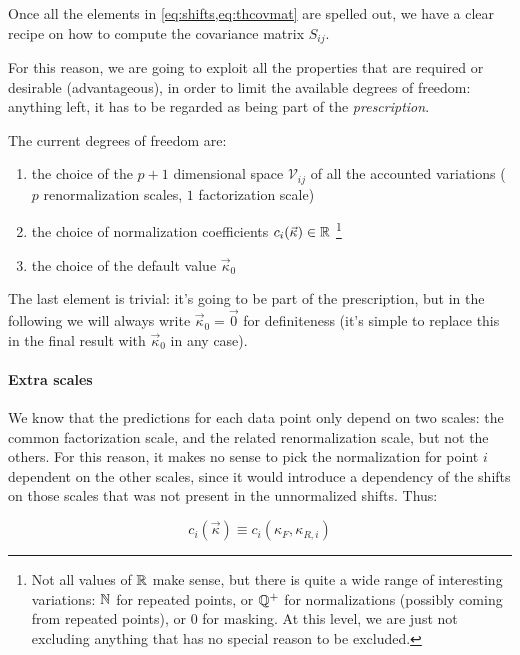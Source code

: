 Once all the elements in \cref{eq:shifts,eq:thcovmat} are spelled out, we have a clear
recipe on how to compute the covariance matrix $S_{ij}$.

For this reason, we are going to exploit all the properties that are required
or desirable (advantageous), in order to limit the available degrees of
freedom: anything left, it has to be regarded as being part of the
\textit{prescription}.

The current degrees of freedom are:

\begin{enumerate}
    \item the choice of the $p + 1$ dimensional space $\mathcal{V}_{ij}$ of all
        the accounted variations ($p$ renormalization scales, $1$ factorization
        scale)
    \item the choice of normalization coefficients $c_i(\vec{\kappa}) \in \mathbb{R}$
        \footnote{
            Not all values of $\mathbb{R}$ make sense, but there is quite a wide range
            of interesting variations: $\mathbb{N}$ for repeated points, or $\mathbb{Q}^+$ for
            normalizations (possibly coming from repeated points), or $0$ for
            masking.
            At this level, we are just not excluding anything that has no
            special reason to be excluded.
        }
    \item the choice of the default value $\vec{\kappa}_0$
\end{enumerate}

The last element is trivial: it's going to be part of the prescription, but in
the following we will always write $\vec{\kappa}_0 = \vec{0}$ for definiteness
(it's simple to replace this in the final result with $\vec{\kappa}_0$ in any
case).

\paragraph{Extra scales} We know that the predictions for each data point only
depend on two scales: the common factorization scale, and the related
renormalization scale, but not the others.
For this reason, it makes no sense to pick the normalization for point $i$
dependent on the other scales, since it would introduce a dependency of the
shifts on those scales that was not present in the unnormalized shifts.
Thus:

\begin{equation}
    \label{eq:2dim-norm}
    c_i(\vec{\kappa}) \equiv c_i(\kappa_F, \kappa_{R,i})
\end{equation}

